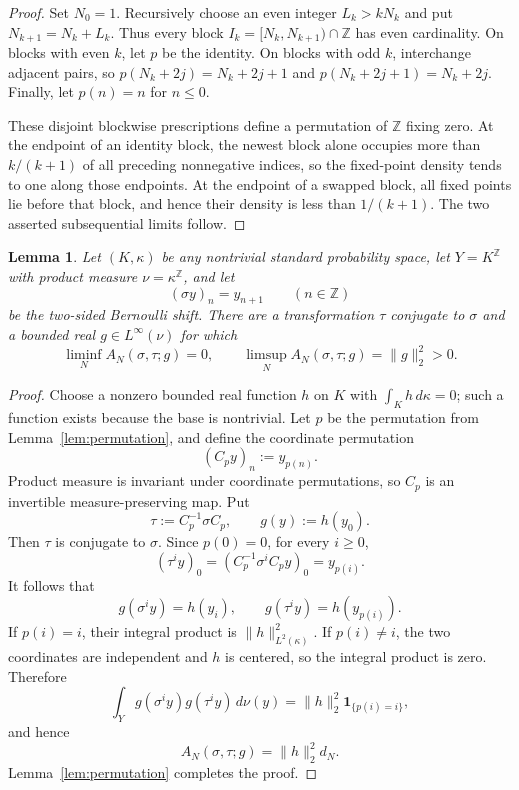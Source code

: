 \documentclass[11pt]{article}
\newtheorem{lemma}[theorem]{Lemma}
\newcommand{\Z}{\mathbb Z}
\begin{document}
\begin{proof}
Set $N_0=1$.  Recursively choose an even integer $L_k>kN_k$ and put
$N_{k+1}=N_k+L_k$.  Thus every block
$I_k=[N_k,N_{k+1})\cap\Z$ has even cardinality.  On blocks with even $k$, let
$p$ be the identity.  On blocks with odd $k$, interchange adjacent pairs, so
$p(N_k+2j)=N_k+2j+1$ and $p(N_k+2j+1)=N_k+2j$.  Finally, let $p(n)=n$ for
$n\leq0$.

These disjoint blockwise prescriptions define a permutation of $\Z$ fixing
zero.  At the endpoint of an identity block, the newest block alone occupies
more than $k/(k+1)$ of all preceding nonnegative indices, so the fixed-point
density tends to one along those endpoints.  At the endpoint of a swapped
block, all fixed points lie before that block, and hence their density is less
than $1/(k+1)$.  The two asserted subsequential limits follow.
\end{proof}

\begin{lemma}\label{lem:bernoulli}
Let $(K,\kappa)$ be any nontrivial standard probability space, let
$Y=K^\Z$ with product measure $\nu=\kappa^\Z$, and let
\[
 (\sigma y)_n=y_{n+1}\qquad(n\in\Z)
\]
be the two-sided Bernoulli shift.  There are a transformation $\tau$ conjugate
to $\sigma$ and a bounded real $g\in L^\infty(\nu)$ for which
\[
 \liminf_N A_N(\sigma,\tau;g)=0,
 \qquad
 \limsup_N A_N(\sigma,\tau;g)=\|g\|_2^2>0.
\]
\end{lemma}

\begin{proof}
Choose a nonzero bounded real function $h$ on $K$ with
$\int_Kh\,d\kappa=0$; such a function exists because the base is nontrivial.
Let $p$ be the permutation from Lemma~\ref{lem:permutation}, and define the
coordinate permutation
\[
 (C_p y)_n:=y_{p(n)}.
\]
Product measure is invariant under coordinate permutations, so $C_p$ is an
invertible measure-preserving map.  Put
\[
 \tau:=C_p^{-1}\sigma C_p,
 \qquad g(y):=h(y_0).
\]
Then $\tau$ is conjugate to $\sigma$.  Since $p(0)=0$, for every $i\geq0$,
\[
 (\tau^i y)_0
 = (C_p^{-1}\sigma^iC_p y)_0
 = y_{p(i)}.
\]
It follows that
\[
 g(\sigma^i y)=h(y_i),
 \qquad
 g(\tau^i y)=h(y_{p(i)}).
\]
If $p(i)=i$, their integral product is $\|h\|_{L^2(\kappa)}^2$.  If
$p(i)\neq i$, the two coordinates are independent and $h$ is centered, so the
integral product is zero.  Therefore
\[
 \int_Yg(\sigma^iy)g(\tau^iy)\,d\nu(y)
 =\|h\|_2^2\mathbf 1_{\{p(i)=i\}},
\]
and hence
\[
 A_N(\sigma,\tau;g)=\|h\|_2^2d_N.
\]
Lemma~\ref{lem:permutation} completes the proof.
\end{proof}
\end{document}
